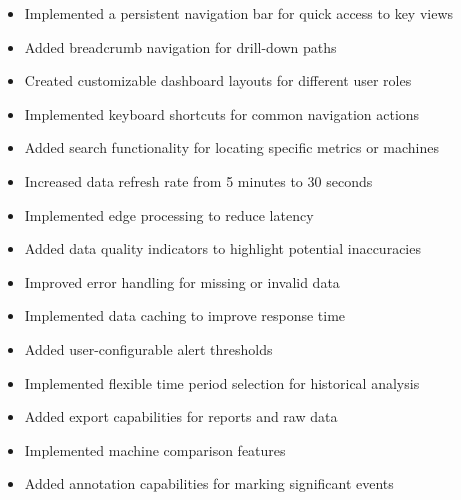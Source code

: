 \documentclass[11pt,a4paper]{article}
\begin{document}
\begin{tcolorbox}[colback=tuliporange!5,colframe=tuliporange,title=Navigation Improvements]
    \begin{itemize}
        \item Implemented a persistent navigation bar for quick access to key views
        \item Added breadcrumb navigation for drill-down paths
        \item Created customizable dashboard layouts for different user roles
        \item Implemented keyboard shortcuts for common navigation actions
        \item Added search functionality for locating specific metrics or machines
    \end{itemize}
\end{tcolorbox}

\begin{tcolorbox}[colback=tulipblue!5,colframe=tulipblue,title=Data Processing Improvements]
    \begin{itemize}
        \item Increased data refresh rate from 5 minutes to 30 seconds
        \item Implemented edge processing to reduce latency
        \item Added data quality indicators to highlight potential inaccuracies
        \item Improved error handling for missing or invalid data
        \item Implemented data caching to improve response time
    \end{itemize}
\end{tcolorbox}

\begin{tcolorbox}[colback=tulipred!5,colframe=tulipred,title=Functionality Improvements]
    \begin{itemize}
        \item Added user-configurable alert thresholds
        \item Implemented flexible time period selection for historical analysis
        \item Added export capabilities for reports and raw data
        \item Implemented machine comparison features
        \item Added annotation capabilities for marking significant events
    \end{itemize}
\end{tcolorbox}
\end{document}
